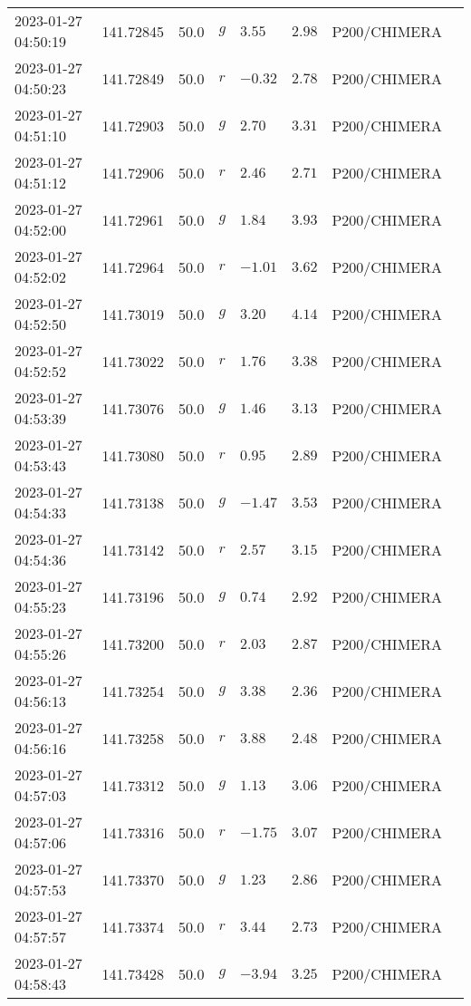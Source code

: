 \documentclass{nature_plusfigure}
\begin{document}
\begin{supplement}
\begin{center}
\begin{longtable}{llllllll}
2023-01-27 04:50:19 & 141.72845 & 50.0 & $g$ & $3.55$ & $2.98$ & P200/CHIMERA &  \\ 
2023-01-27 04:50:23 & 141.72849 & 50.0 & $r$ & $-0.32$ & $2.78$ & P200/CHIMERA &  \\ 
2023-01-27 04:51:10 & 141.72903 & 50.0 & $g$ & $2.70$ & $3.31$ & P200/CHIMERA &  \\ 
2023-01-27 04:51:12 & 141.72906 & 50.0 & $r$ & $2.46$ & $2.71$ & P200/CHIMERA &  \\ 
2023-01-27 04:52:00 & 141.72961 & 50.0 & $g$ & $1.84$ & $3.93$ & P200/CHIMERA &  \\ 
2023-01-27 04:52:02 & 141.72964 & 50.0 & $r$ & $-1.01$ & $3.62$ & P200/CHIMERA &  \\ 
2023-01-27 04:52:50 & 141.73019 & 50.0 & $g$ & $3.20$ & $4.14$ & P200/CHIMERA &  \\ 
2023-01-27 04:52:52 & 141.73022 & 50.0 & $r$ & $1.76$ & $3.38$ & P200/CHIMERA &  \\ 
2023-01-27 04:53:39 & 141.73076 & 50.0 & $g$ & $1.46$ & $3.13$ & P200/CHIMERA &  \\ 
2023-01-27 04:53:43 & 141.73080 & 50.0 & $r$ & $0.95$ & $2.89$ & P200/CHIMERA &  \\ 
2023-01-27 04:54:33 & 141.73138 & 50.0 & $g$ & $-1.47$ & $3.53$ & P200/CHIMERA &  \\ 
2023-01-27 04:54:36 & 141.73142 & 50.0 & $r$ & $2.57$ & $3.15$ & P200/CHIMERA &  \\ 
2023-01-27 04:55:23 & 141.73196 & 50.0 & $g$ & $0.74$ & $2.92$ & P200/CHIMERA &  \\ 
2023-01-27 04:55:26 & 141.73200 & 50.0 & $r$ & $2.03$ & $2.87$ & P200/CHIMERA &  \\ 
2023-01-27 04:56:13 & 141.73254 & 50.0 & $g$ & $3.38$ & $2.36$ & P200/CHIMERA &  \\ 
2023-01-27 04:56:16 & 141.73258 & 50.0 & $r$ & $3.88$ & $2.48$ & P200/CHIMERA &  \\ 
2023-01-27 04:57:03 & 141.73312 & 50.0 & $g$ & $1.13$ & $3.06$ & P200/CHIMERA &  \\ 
2023-01-27 04:57:06 & 141.73316 & 50.0 & $r$ & $-1.75$ & $3.07$ & P200/CHIMERA &  \\ 
2023-01-27 04:57:53 & 141.73370 & 50.0 & $g$ & $1.23$ & $2.86$ & P200/CHIMERA &  \\ 
2023-01-27 04:57:57 & 141.73374 & 50.0 & $r$ & $3.44$ & $2.73$ & P200/CHIMERA &  \\ 
2023-01-27 04:58:43 & 141.73428 & 50.0 & $g$ & $-3.94$ & $3.25$ & P200/CHIMERA &  \\ 

\end{longtable}
\end{center}
\end{supplement}
\end{document}
